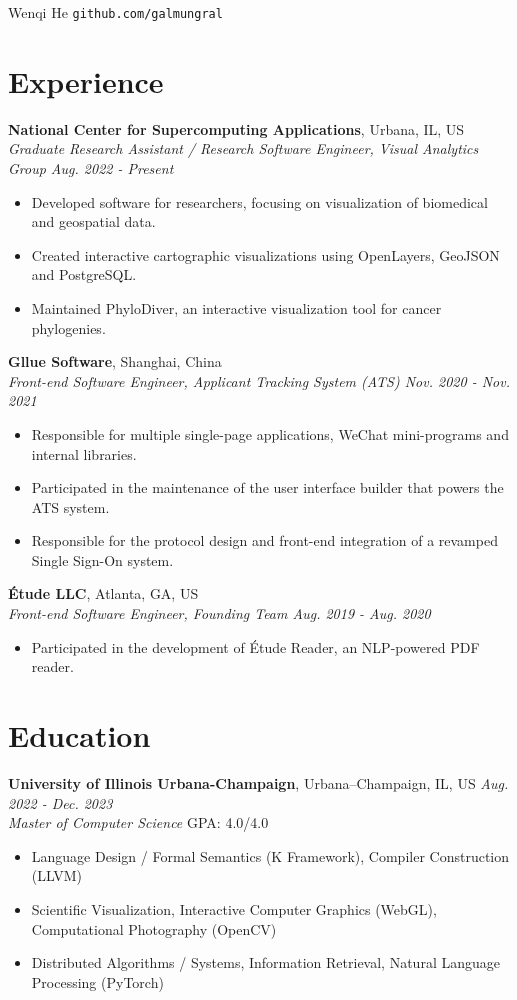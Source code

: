 \documentclass[11pt]{article}
\begin{document}
{\Huge Wenqi He} \quad \texttt{github.com/galmungral}

\section*{Experience}
\textbf{National Center for Supercomputing Applications}, Urbana, IL, US\\
\textit{\textit{Graduate Research Assistant / Research Software Engineer}, Visual Analytics Group \hfill Aug. 2022 - Present}
\begin{itemize}
\item Developed software for researchers, focusing on visualization of biomedical and geospatial data.
\item Created interactive cartographic visualizations using OpenLayers, GeoJSON and PostgreSQL.
\item Maintained PhyloDiver, an interactive visualization tool for cancer phylogenies.
\end{itemize}
\vspace{0.5em}
\textbf{Gllue Software}, Shanghai, China\\
\textit{Front-end Software Engineer, Applicant Tracking System (ATS) \hfill Nov. 2020 - Nov. 2021}
\begin{itemize}
\item Responsible for multiple single-page applications, WeChat mini-programs and internal libraries.
\item Participated in the maintenance of the user interface builder that powers the ATS system.
\item Responsible for the protocol design and front-end integration of a revamped Single Sign-On system.
\end{itemize}
\vspace{0.5em}
\textbf{Étude LLC}, Atlanta, GA, US\\
\textit{Front-end Software Engineer, Founding Team \hfill Aug. 2019 - Aug. 2020}
\begin{itemize}
\item Participated in the development of Étude Reader, an NLP-powered PDF reader.
\end{itemize}

\section*{Education}
\textbf{University of Illinois Urbana-Champaign}, Urbana–Champaign, IL, US \hfill \textit{Aug. 2022 - Dec. 2023} \\
\textit{Master of Computer Science}  \hfill GPA: 4.0/4.0 
\begin{itemize}
\item Language Design / Formal Semantics (K Framework), Compiler Construction (LLVM)
\item Scientific Visualization, Interactive Computer Graphics (WebGL), Computational Photography (OpenCV)
\item Distributed Algorithms / Systems, Information Retrieval, Natural Language Processing (PyTorch)
\end{itemize}
\end{document}
